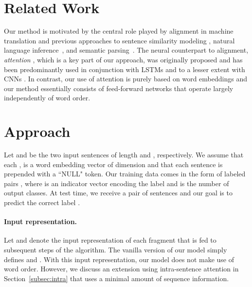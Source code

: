 \documentclass[11pt,letterpaper]{article}
\begin{document}
\vspace{-0.1cm}
\section{Related Work}
\vspace{-0.1cm}

Our method is motivated by the central role played by alignment in machine translation \cite{koehn2009statistical} and previous approaches to sentence similarity modeling \cite{haghighi2005robust,das2009paraphrase,chang2010discriminative,fader2013paraphrase}, natural language inference~\cite{marsi2005classification,maccartney2006learning,hickl2007discourse,maccartney2008phrase}, and semantic parsing~\cite{andreas2013semantic}.
The neural counterpart to alignment, \emph{attention} \cite{bahdanau2014neural}, which is a key part of our approach, was originally proposed and has been predominantly used in conjunction with LSTMs \cite{rocktaschel2015reasoning,wang2015learning} and to a lesser extent with CNNs \cite{yin2015abcnn}.
In contrast, our use of attention is purely based on word embeddings and our method essentially consists of feed-forward networks that operate largely independently of word order.

\vspace{-0.1cm}
\section{Approach}
\label{sec:approach}
\vspace{-0.1cm}

Let  and  be the two input sentences of length  and , respectively.
We assume that each ,  is a word embedding vector of dimension  and that each sentence is prepended with a ``NULL" token. Our training data comes in the form of labeled pairs , where  is an indicator vector encoding the label and  is the number of output classes.
At test time, we receive a pair of sentences  and our goal is to predict the correct label .


\paragraph{Input representation.} Let  and  denote the input representation of each fragment that is fed to subsequent steps of the algorithm. The vanilla version of our model simply defines  and . With this input representation, our model does not make use of word order.
However, we discuss an extension using intra-sentence attention in Section~\ref{subsec:intra} that uses a minimal amount of sequence information.
\end{document}
